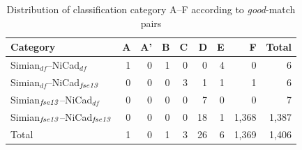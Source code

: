 \documentclass{IEEEtran}
\begin{document}

\begin{table}[H]
	\centering
	\caption{Distribution of classification category A--F according to \textit{good}-match pairs}
	\label{tab:good_classification}
	\begin{tabular}{|l|r|r|r|r|r|r|r|r|}
		\hline 
		Category   & A   & 	A'   & 	B   & C   & D   &	E   &	F   & Total  \\
		\hline
		Simian$_{df}$--NiCad$_{df}$   & 1 & 0 & 1 & 0 & 0 & 4 & 0 & 6 \\
		Simian$_{df}$--NiCad$_{\textrm{\textit{fse13}}}$   & 0 & 0 & 0 & 3 & 1 & 1 & 1 & 6 \\
		Simian$_{\textrm{\textit{fse13}}}$--NiCad$_{df}$   & 0 & 0 & 0 & 0 & 7 & 0 & 0 & 7 \\
		Simian$_{\textrm{\textit{fse13}}}$--NiCad$_{\textrm{\textit{fse13}}}$   & 0 & 0 & 0 & 0 & 18 & 1 & 1,368 & 1,387 \\
		\hline
		Total   &   1   &   0   &   1   &   3   &   26   &   6   & 1,369  & 1,406 \\
		\hline
	\end{tabular} 
\end{table}
\end{document}

